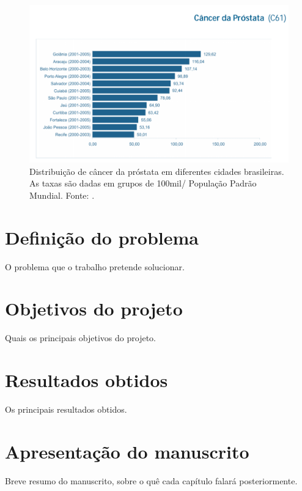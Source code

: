 \begin{figure}[h]
\hfill{}\includegraphics[scale=0.5]{figs/introducao/cancer_prostata}\hfill{}

\caption{\label{fig:IntroducaoDistribuicaoProstata}Distribuição de câncer
da próstata em diferentes cidades brasileiras. As taxas são dadas
em grupos de 100mil/ População Padrão Mundial. Fonte: \cite{INCA2005}.}
\end{figure}





\section{Definição do problema}

O problema que o trabalho pretende solucionar.


\section{Objetivos do projeto}

Quais os principais objetivos do projeto.


\section{Resultados obtidos}

Os principais resultados obtidos.


\section{Apresentação do manuscrito}

Breve resumo do manuscrito, sobre o quê cada capítulo falará posteriormente.
